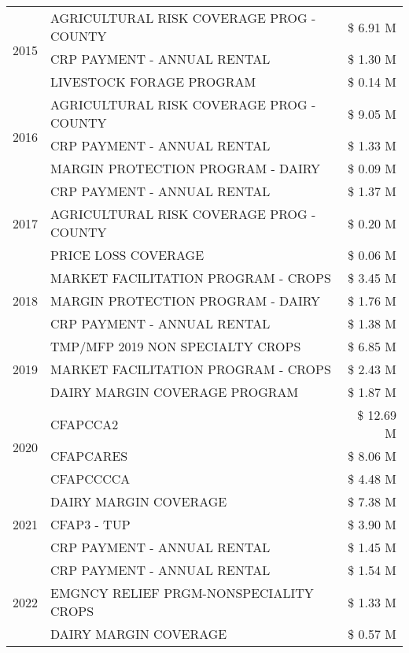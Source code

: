 \begin{tabular}{llr}
\cline{1-3}
\multirow[t]{3}{*}{2015} & AGRICULTURAL RISK COVERAGE PROG - COUNTY & \$ 6.91 M \\
 & CRP PAYMENT - ANNUAL RENTAL & \$ 1.30 M \\
 & LIVESTOCK FORAGE PROGRAM & \$ 0.14 M \\
\cline{1-3}
\multirow[t]{3}{*}{2016} & AGRICULTURAL RISK COVERAGE PROG - COUNTY & \$ 9.05 M \\
 & CRP PAYMENT - ANNUAL RENTAL & \$ 1.33 M \\
 & MARGIN PROTECTION PROGRAM - DAIRY & \$ 0.09 M \\
\cline{1-3}
\multirow[t]{3}{*}{2017} & CRP PAYMENT - ANNUAL RENTAL & \$ 1.37 M \\
 & AGRICULTURAL RISK COVERAGE PROG - COUNTY & \$ 0.20 M \\
 & PRICE LOSS COVERAGE & \$ 0.06 M \\
\cline{1-3}
\multirow[t]{3}{*}{2018} & MARKET FACILITATION PROGRAM - CROPS & \$ 3.45 M \\
 & MARGIN PROTECTION PROGRAM - DAIRY & \$ 1.76 M \\
 & CRP PAYMENT - ANNUAL RENTAL & \$ 1.38 M \\
\cline{1-3}
\multirow[t]{3}{*}{2019} & TMP/MFP 2019 NON SPECIALTY CROPS & \$ 6.85 M \\
 & MARKET FACILITATION PROGRAM - CROPS & \$ 2.43 M \\
 & DAIRY MARGIN COVERAGE PROGRAM & \$ 1.87 M \\
\cline{1-3}
\multirow[t]{3}{*}{2020} & CFAPCCA2 & \$ 12.69 M \\
 & CFAPCARES & \$ 8.06 M \\
 & CFAPCCCCA & \$ 4.48 M \\
\cline{1-3}
\multirow[t]{3}{*}{2021} & DAIRY MARGIN COVERAGE & \$ 7.38 M \\
 & CFAP3 - TUP & \$ 3.90 M \\
 & CRP PAYMENT - ANNUAL RENTAL & \$ 1.45 M \\
\cline{1-3}
\multirow[t]{3}{*}{2022} & CRP PAYMENT - ANNUAL RENTAL & \$ 1.54 M \\
 & EMGNCY RELIEF PRGM-NONSPECIALITY CROPS & \$ 1.33 M \\
 & DAIRY MARGIN COVERAGE & \$ 0.57 M \\
\cline{1-3}
\bottomrule
\end{tabular}
